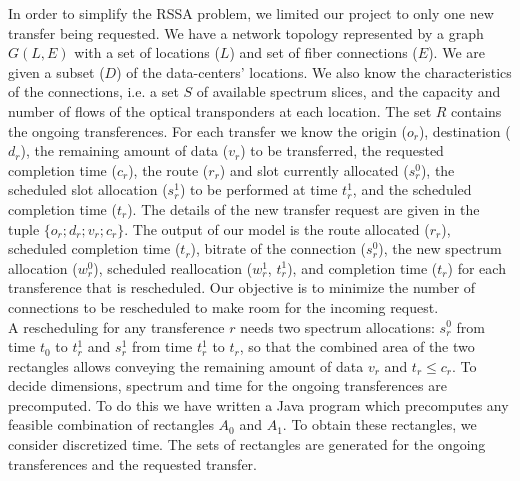 \documentclass[11pt,a4paper]{article}
\begin{document}
In order to simplify the RSSA problem, we limited our project to only one new transfer being requested. We have a network topology represented by a graph $G(L,E)$ with a set of locations ($L$) and set of fiber connections ($E$). We are given a subset ($D$) of the data-centers' locations. We also know the characteristics of the connections, i.e. a set $S$ of available spectrum slices, and the capacity and number of flows of the optical transponders at each location. The set $R$ contains the ongoing transferences. For each transfer we know the origin ($o_{r}$), destination ($d_{r}$), the remaining amount of data ($v_{r}$) to be transferred, the requested completion time ($c_{r}$), the route ($r_{r}$) and slot currently allocated ($s^{0}_{r}$), the scheduled slot allocation ($s^{1}_{r}$) to be performed at time $t^{1}_{r}$, and the scheduled completion time ($t_{r}$). The details of the new transfer request are given in the tuple $\{o_{r}; d_{r}; v_{r}; c_{r}\}$. The output of our model is the route allocated ($r_{r}$), scheduled completion time ($t_{r}$), bitrate of the connection ($s^{0}_{r}$), the new spectrum allocation ($w^{0}_{r}$), scheduled reallocation ($w^{1}_{r}$, $t^{1}_{r}$), and completion time ($t_{r}$) for each transference that is rescheduled. Our objective is to minimize the number of connections to be rescheduled to make room for the incoming request.\\

A rescheduling for any transference $r$ needs two spectrum allocations: $s^{0}_{r}$ from time $t_{0}$ to $t^{1}_{r}$ and $s^{1}_{r}$ from time $t^{1}_{r}$ to $t_{r}$, so that the combined area of the two rectangles allows conveying the remaining amount of data $v_{r}$ and $t_{r} \leq  c_{r}$. To decide dimensions, spectrum and time for the ongoing transferences are precomputed. To do this we have written a Java program which precomputes any feasible combination of rectangles $A_{0}$ and $A_{1}$. To obtain these rectangles, we consider discretized time. The sets of rectangles are generated for the ongoing transferences and the requested transfer.\\\\
\end{document}
